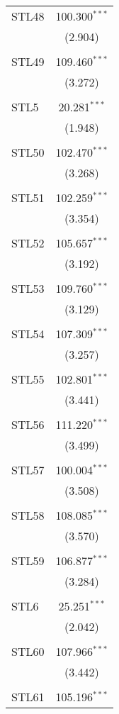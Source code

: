 \begin{table}[!htbp]
\begin{tabular}{@{\extracolsep{5pt}}lc}
 STL48 & 100.300$^{***}$ \\ 
  & (2.904) \\ 
  & \\ 
 STL49 & 109.460$^{***}$ \\ 
  & (3.272) \\ 
  & \\ 
 STL5 & 20.281$^{***}$ \\ 
  & (1.948) \\ 
  & \\ 
 STL50 & 102.470$^{***}$ \\ 
  & (3.268) \\ 
  & \\ 
 STL51 & 102.259$^{***}$ \\ 
  & (3.354) \\ 
  & \\ 
 STL52 & 105.657$^{***}$ \\ 
  & (3.192) \\ 
  & \\ 
 STL53 & 109.760$^{***}$ \\ 
  & (3.129) \\ 
  & \\ 
 STL54 & 107.309$^{***}$ \\ 
  & (3.257) \\ 
  & \\ 
 STL55 & 102.801$^{***}$ \\ 
  & (3.441) \\ 
  & \\ 
 STL56 & 111.220$^{***}$ \\ 
  & (3.499) \\ 
  & \\ 
 STL57 & 100.004$^{***}$ \\ 
  & (3.508) \\ 
  & \\ 
 STL58 & 108.085$^{***}$ \\ 
  & (3.570) \\ 
  & \\ 
 STL59 & 106.877$^{***}$ \\ 
  & (3.284) \\ 
  & \\ 
 STL6 & 25.251$^{***}$ \\ 
  & (2.042) \\ 
  & \\ 
 STL60 & 107.966$^{***}$ \\ 
  & (3.442) \\ 
  & \\ 
 STL61 & 105.196$^{***}$ \\ 

\end{tabular}
\end{table}
